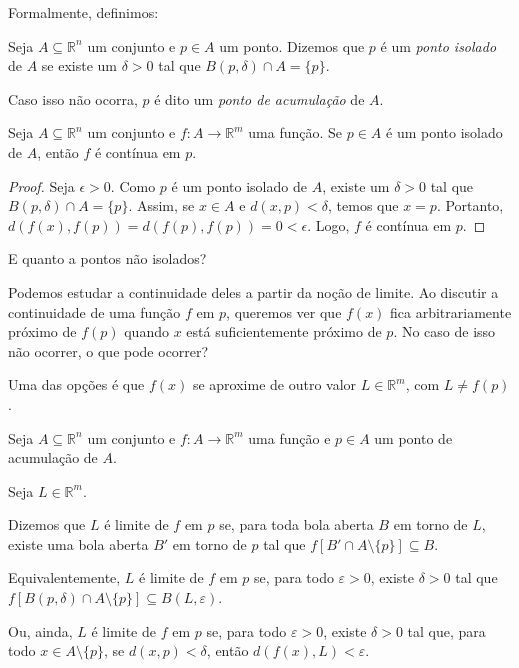     Formalmente, definimos:

    \begin{definition}
        Seja $A\subseteq \mathbb R^n$ um conjunto e $p \in A$ um ponto. Dizemos que $p$ é um \emph{ponto isolado}  de $A$ se existe um $\delta>0$ tal que $B(p,\delta) \cap A = \{p\}$.

        Caso isso não ocorra, $p$ é dito um \emph{ponto de acumulação}  de $A$.
    \end{definition}

    \begin{proposition}
        Seja $A\subseteq \mathbb R^n$ um conjunto e $f: A \to \mathbb R^m$ uma função. Se $p \in A$ é um ponto isolado de $A$, então $f$ é contínua em $p$.
    \end{proposition}

    \begin{proof}
        Seja $\epsilon>0$. Como $p$ é um ponto isolado de $A$, existe um $\delta>0$ tal que $B(p,\delta) \cap A = \{p\}$. Assim, se $x \in A$ e $d(x, p) < \delta$, temos que $x = p$. Portanto, $d(f(x), f(p)) = d(f(p), f(p)) = 0 < \epsilon$. Logo, $f$ é contínua em $p$.
    \end{proof}

    E quanto a pontos não isolados?

    Podemos estudar a continuidade deles a partir da noção de limite.
    Ao discutir a continuidade de uma função $f$ em $p$, queremos ver que $f(x)$ fica arbitrariamente próximo de $f(p)$ quando $x$ está suficientemente próximo de $p$.
    No caso de isso não ocorrer, o que pode ocorrer?

    Uma das opções é que $f(x)$ se aproxime de outro valor $L \in \mathbb R^m$, com $L \neq f(p)$.

    \begin{definition}
        Seja $A\subseteq \mathbb R^n$ um conjunto e $f: A \to \mathbb R^m$ uma função e $p \in A$ um ponto de acumulação de $A$.

        Seja $L \in \mathbb R^m$.

        Dizemos que $L$ é limite de $f$ em $p$ se, para toda bola aberta $B$ em torno de $L$, existe uma bola aberta $B'$ em torno de $p$ tal que $f[B'\cap A\setminus\{p\}]\subseteq B$.

        Equivalentemente, $L$ é limite de $f$ em $p$ se, para todo $\varepsilon > 0$, existe $\delta > 0$ tal que $f[B(p, \delta)\cap A\setminus\{p\}]\subseteq B(L, \varepsilon)$.

         Ou, ainda, $L$ é limite de $f$ em $p$ se, para todo $\varepsilon > 0$, existe $\delta > 0$ tal que, para todo $x \in A\setminus\{p\}$, se $d(x, p) < \delta$, então $d(f(x), L) < \varepsilon$.
    \end{definition}